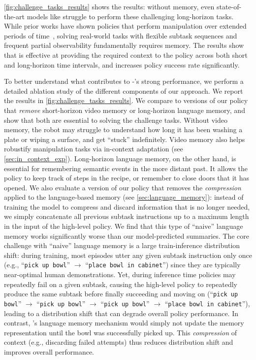 \cref{fig:challenge_tasks_results} shows the results: without memory, even state-of-the-art models like \pizerosix{} struggle to perform these challenging long-horizon tasks. While prior works have shown policies that perform manipulation over extended periods of time~\citep{intelligence2025pi}, 
solving real-world tasks with flexible subtask sequences and frequent partial observability fundamentally requires memory. %
The results show that \Acronym{} is effective at providing the required context to the policy across both short and long-horizon time intervals, and increases policy success rate significantly.

To better understand what contributes to \pizerosix{}-\Acronym{}'s strong performance, we perform a detailed ablation study of the different components of our approach. We report the results in \cref{fig:challenge_tasks_results}. We compare to versions of our policy that \emph{remove} short-horizon video memory or long-horizon language memory, and show that both are essential to solving the challenge tasks. Without video memory, the robot may struggle to understand how long it has been washing a plate or wiping a surface, and get ``stuck'' indefinitely. Video memory also helps robustify manipulation tasks via in-context adaptation (see \cref{sec:in_context_exp}). Long-horizon language memory, on the other hand, is essential for remembering semantic events in the more distant past. It allows the policy to keep track of steps in the recipe, or remember to close doors that it has opened. We also evaluate a version of our policy that removes the \emph{compression} applied to the language-based memory (see \cref{sec:language_memory}): instead of training the model to compress and discard information that is no longer needed, we simply concatenate all previous subtask instructions up to a maximum length in the input of the high-level policy. We find that this type of ``naive'' language memory works significantly worse than our model-predicted summaries. The core challenge with ``naive'' language memory is a large train-inference distribution shift: during training, most episodes utter any given subtask instruction only once (e.g., ``\texttt{pick up bowl}'' $\rightarrow$ ``\texttt{place bowl in cabinet}'') since they are typically near-optimal human demonstrations. Yet, during inference time policies may repeatedly fail on a given subtask, causing the high-level policy to repeatedly produce the same subtask before finally succeeding and moving on (``\texttt{pick up bowl}'' $\rightarrow$ ``\texttt{pick up bowl}'' $\rightarrow$ ``\texttt{pick up bowl}'' $\rightarrow$ ``\texttt{place bowl in cabinet}''), leading to a distribution shift that can degrade overall policy performance. In contrast, \Acronym{}'s language memory mechanism would simply not update the memory representation until the bowl was successfully picked up. This \emph{compression} of context (e.g., discarding failed attempts) thus reduces distribution shift and improves overall performance. 


